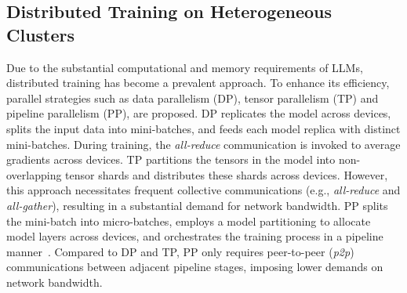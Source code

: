 \documentclass[conference]{IEEEtran}
\begin{document}
\subsection{Distributed Training on Heterogeneous Clusters}

Due to the substantial computational and memory requirements of LLMs, distributed training has become a prevalent approach.
To enhance its efficiency, parallel strategies such as data parallelism (DP), tensor parallelism (TP) and pipeline parallelism (PP), are proposed.
DP replicates the model across devices, splits the input data into mini-batches, and feeds each model replica with distinct mini-batches.
During training, the \textit{all-reduce} communication is invoked to average gradients across devices.
TP partitions the tensors in the model into non-overlapping tensor shards and distributes these shards across devices.
However, this approach necessitates frequent collective communications (e.g., \textit{all-reduce} and \textit{all-gather}), resulting in a substantial demand for network bandwidth.
PP splits the mini-batch into micro-batches, employs a model partitioning to allocate model layers across devices, and orchestrates the training process in a pipeline manner~\cite{huang2019gpipeefficienttraininggiant, narayanan2019pipedream}.
Compared to DP and TP, PP only requires peer-to-peer (\textit{p2p}) communications between adjacent pipeline stages, imposing lower demands on network bandwidth.
\end{document}
